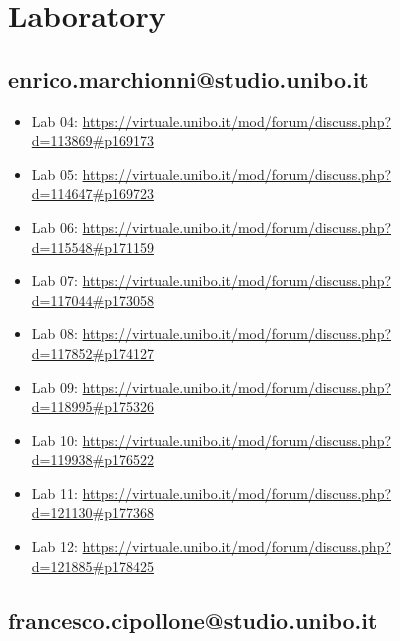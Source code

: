 \documentclass[12pt, a4paper]{report}
\theoremstyle{definition}
\begin{document}
\chapter{Laboratory}

\section{enrico.marchionni@studio.unibo.it}

\begin{itemize}
    \item Lab 04: \url{https://virtuale.unibo.it/mod/forum/discuss.php?d=113869#p169173}
    \item Lab 05: \url{https://virtuale.unibo.it/mod/forum/discuss.php?d=114647#p169723}
    \item Lab 06: \url{https://virtuale.unibo.it/mod/forum/discuss.php?d=115548#p171159}
    \item Lab 07: \url{https://virtuale.unibo.it/mod/forum/discuss.php?d=117044#p173058}
    \item Lab 08: \url{https://virtuale.unibo.it/mod/forum/discuss.php?d=117852#p174127}
    \item Lab 09: \url{https://virtuale.unibo.it/mod/forum/discuss.php?d=118995#p175326}
    \item Lab 10: \url{https://virtuale.unibo.it/mod/forum/discuss.php?d=119938#p176522}
    \item Lab 11: \url{https://virtuale.unibo.it/mod/forum/discuss.php?d=121130#p177368}
    \item Lab 12: \url{https://virtuale.unibo.it/mod/forum/discuss.php?d=121885#p178425}
\end{itemize}

\section{francesco.cipollone@studio.unibo.it}
\end{document}
